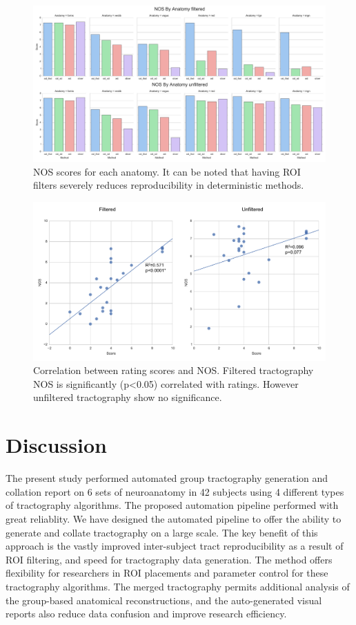 \begin{figure}[ht]
\centering
\includegraphics[width=\textwidth]{figure6.pdf}
\caption{NOS scores for each anatomy. It can be noted that having ROI filters severely reduces reproducibility in deterministic methods.}
\label{fig:SGfigure6}
\end{figure}

\begin{figure}[ht]
\centering
\includegraphics[width=\textwidth]{figure7.pdf}
\caption{Correlation between rating scores and NOS. Filtered tractography NOS is significantly (p\textless 0.05) correlated with ratings. However unfiltered tractography show no significance.}
\label{fig:SGfigure7}
\end{figure}

\section{Discussion}

The present study performed automated group tractography generation and collation report on 6 sets of neuroanatomy in 42 subjects using 4 different types of tractography algorithms. The proposed automation pipeline performed with great reliablity. We have designed the automated pipeline to offer the ability to generate and collate tractography on a large scale. The key benefit of this approach is the vastly improved inter-subject tract reproducibility as a result of ROI filtering, and speed for tractography data generation. The method offers flexibility for researchers in ROI placements and parameter control for these tractography algorithms. The merged tractography permits additional analysis of the group-based anatomical reconstructions, and the auto-generated visual reports also reduce data confusion and improve research efficiency. 


